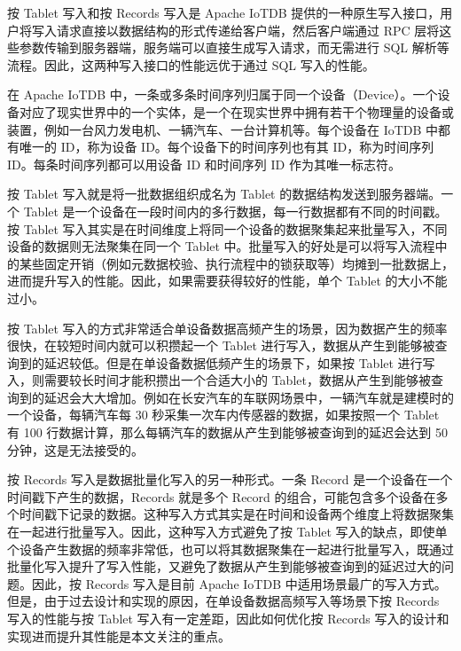 按 Tablet 写入和按 Records 写入是 Apache IoTDB 提供的一种原生写入接口，用户将写入请求直接以数据结构的形式传递给客户端，然后客户端通过 RPC 层将这些参数传输到服务器端，服务端可以直接生成写入请求，而无需进行 SQL 解析等流程。因此，这两种写入接口的性能远优于通过 SQL 写入的性能。

在 Apache IoTDB 中，一条或多条时间序列归属于同一个设备（Device）\cite{apache2024iotdbdevice}。一个设备对应了现实世界中的一个实体，是一个在现实世界中拥有若干个物理量的设备或装置，例如一台风力发电机、一辆汽车、一台计算机等。每个设备在 IoTDB 中都有唯一的 ID，称为设备 ID。每个设备下的时间序列也有其 ID，称为时间序列 ID。每条时间序列都可以用设备 ID 和时间序列 ID 作为其唯一标志符。

按 Tablet 写入就是将一批数据组织成名为 Tablet 的数据结构发送到服务器端。一个 Tablet 是一个设备在一段时间内的多行数据，每一行数据都有不同的时间戳。按 Tablet 写入其实是在时间维度上将同一个设备的数据聚集起来批量写入，不同设备的数据则无法聚集在同一个 Tablet 中。批量写入的好处是可以将写入流程中的某些固定开销（例如元数据校验、执行流程中的锁获取等）均摊到一批数据上，进而提升写入的性能。因此，如果需要获得较好的性能，单个 Tablet 的大小不能过小。

按 Tablet 写入的方式非常适合单设备数据高频产生的场景，因为数据产生的频率很快，在较短时间内就可以积攒起一个 Tablet 进行写入，数据从产生到能够被查询到的延迟较低。但是在单设备数据低频产生的场景下，如果按 Tablet 进行写入，则需要较长时间才能积攒出一个合适大小的 Tablet，数据从产生到能够被查询到的延迟会大大增加。例如在长安汽车的车联网场景中，一辆汽车就是建模时的一个设备，每辆汽车每 30 秒采集一次车内传感器的数据，如果按照一个 Tablet 有 100 行数据计算，那么每辆汽车的数据从产生到能够被查询到的延迟会达到 50 分钟，这是无法接受的。

按 Records 写入是数据批量化写入的另一种形式。一条 Record 是一个设备在一个时间戳下产生的数据，Records 就是多个 Record 的组合，可能包含多个设备在多个时间戳下记录的数据。这种写入方式其实是在时间和设备两个维度上将数据聚集在一起进行批量写入。因此，这种写入方式避免了按 Tablet 写入的缺点，即使单个设备产生数据的频率非常低，也可以将其数据聚集在一起进行批量写入，既通过批量化写入提升了写入性能，又避免了数据从产生到能够被查询到的延迟过大的问题。因此，按 Records 写入是目前 Apache IoTDB 中适用场景最广的写入方式。但是，由于过去设计和实现的原因，在单设备数据高频写入等场景下按 Records 写入的性能与按 Tablet 写入有一定差距，因此如何优化按 Records 写入的设计和实现进而提升其性能是本文关注的重点。

